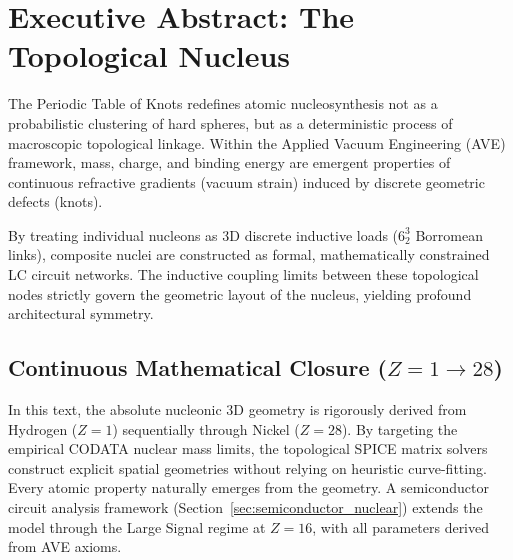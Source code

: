 \chapter{Executive Abstract: The Topological Nucleus}
\label{ch:intro}

The Periodic Table of Knots redefines atomic nucleosynthesis not as a probabilistic clustering of hard spheres, but as a deterministic process of macroscopic topological linkage. Within the Applied Vacuum Engineering (AVE) framework, mass, charge, and binding energy are emergent properties of continuous refractive gradients (vacuum strain) induced by discrete geometric defects (knots).

By treating individual nucleons as 3D discrete inductive loads ($6^3_2$ Borromean links), composite nuclei are constructed as formal, mathematically constrained LC circuit networks. The inductive coupling limits between these topological nodes strictly govern the geometric layout of the nucleus, yielding profound architectural symmetry. 

\section{Continuous Mathematical Closure ($Z=1 \rightarrow 28$)}
In this text, the absolute nucleonic 3D geometry is rigorously derived from Hydrogen ($Z=1$) sequentially through Nickel ($Z=28$). By targeting the empirical CODATA nuclear mass limits, the topological SPICE matrix solvers construct explicit spatial geometries without relying on heuristic curve-fitting. Every atomic property naturally emerges from the geometry. A semiconductor circuit analysis framework (Section~\ref{sec:semiconductor_nuclear}) extends the model through the Large Signal regime at $Z=16$, with all parameters derived from AVE axioms.

